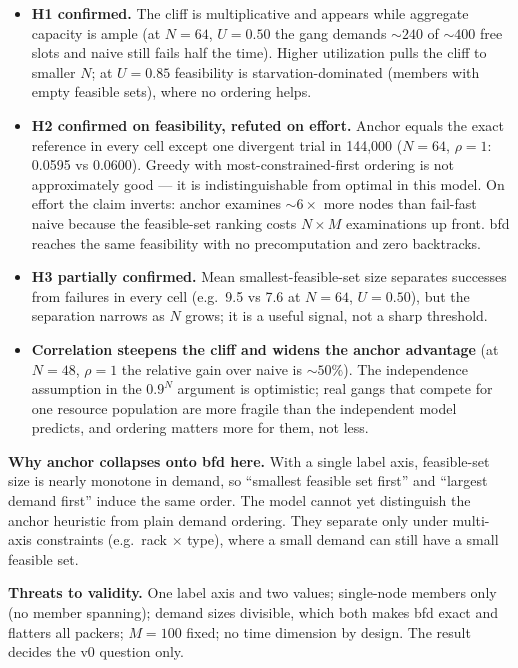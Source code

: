 \documentclass[11pt]{article}
\begin{document}
\begin{itemize}
\item \textbf{H1 confirmed.} The cliff is multiplicative and appears while
  aggregate capacity is ample (at $N = 64$, $U = 0.50$ the gang demands
  ${\sim}240$ of ${\sim}400$ free slots and naive still fails half the
  time). Higher utilization pulls the cliff to smaller $N$; at $U = 0.85$
  feasibility is starvation-dominated (members with empty feasible sets),
  where no ordering helps.
\item \textbf{H2 confirmed on feasibility, refuted on effort.} Anchor
  equals the exact reference in every cell except one divergent trial in
  144{,}000 ($N = 64$, $\rho = 1$: 0.0595 vs 0.0600). Greedy with
  most-constrained-first ordering is not approximately good --- it is
  indistinguishable from optimal in this model. On effort the claim
  inverts: anchor examines ${\sim}6\times$ more nodes than fail-fast naive
  because the feasible-set ranking costs $N \times M$ examinations up
  front. bfd reaches the same feasibility with no precomputation and zero
  backtracks.
\item \textbf{H3 partially confirmed.} Mean smallest-feasible-set size
  separates successes from failures in every cell (e.g.\ 9.5 vs 7.6 at
  $N = 64$, $U = 0.50$), but the separation narrows as $N$ grows; it is a
  useful signal, not a sharp threshold.
\item \textbf{Correlation steepens the cliff and widens the anchor
  advantage} (at $N = 48$, $\rho = 1$ the relative gain over naive is
  ${\sim}50\%$). The independence assumption in the $0.9^N$ argument is
  optimistic; real gangs that compete for one resource population are more
  fragile than the independent model predicts, and ordering matters more
  for them, not less.
\end{itemize}

\textbf{Why anchor collapses onto bfd here.} With a single label axis,
feasible-set size is nearly monotone in demand, so ``smallest feasible set
first'' and ``largest demand first'' induce the same order. The model
cannot yet distinguish the anchor heuristic from plain demand ordering.
They separate only under multi-axis constraints (e.g.\ rack $\times$ type),
where a small demand can still have a small feasible set.

\textbf{Threats to validity.} One label axis and two values; single-node
members only (no member spanning); demand sizes divisible, which both makes
bfd exact and flatters all packers; $M = 100$ fixed; no time dimension by
design. The result decides the v0 question only.
\end{document}
